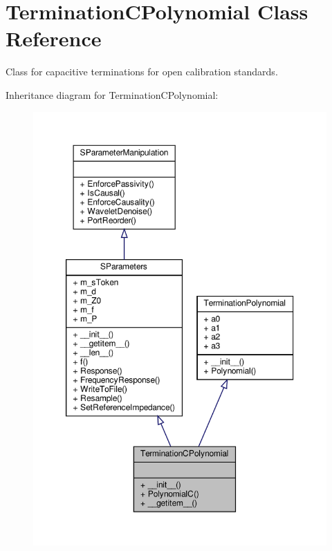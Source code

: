 \hypertarget{classSignalIntegrity_1_1Measurement_1_1CalKit_1_1Standards_1_1TerminationPolynomial_1_1TerminationCPolynomial}{}\section{Termination\+C\+Polynomial Class Reference}
\label{classSignalIntegrity_1_1Measurement_1_1CalKit_1_1Standards_1_1TerminationPolynomial_1_1TerminationCPolynomial}


Class for capacitive terminations for open calibration standards.  




Inheritance diagram for Termination\+C\+Polynomial\+:\nopagebreak
\begin{figure}[H]
\begin{center}
\leavevmode
\includegraphics[width=350pt]{classSignalIntegrity_1_1Measurement_1_1CalKit_1_1Standards_1_1TerminationPolynomial_1_1TerminationCPolynomial__inherit__graph}
\end{center}
\end{figure}


